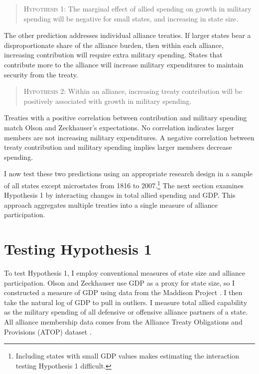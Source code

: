 \documentclass[12pt]{article}
\begin{document}
\begin{quote}
\textsc{Hypothesis 1}: The marginal effect of allied spending on growth in military spending will be negative for small states, and increasing in state size. 
\end{quote}


The other prediction addresses individual alliance treaties. 
If larger states bear a disproportionate share of the alliance burden, then within each alliance, increasing contribution will require extra military spending. 
States that contribute more to the alliance will increase military expenditures to maintain security from the treaty. 


\begin{quote}
\textsc{Hypothesis 2}: Within an alliance, increasing treaty contribution will be positively associated with growth in military spending. 
\end{quote}


Treaties with a positive correlation between contribution and military spending match Olson and Zeckhauser's expectations. 
No correlation indicates larger members are not increasing military expenditures.
A negative correlation between treaty contribution and military spending implies larger members decrease spending. 


I now test these two predictions using an appropriate research design in a sample of all states except microstates from 1816 to 2007.\footnote{Including states with small GDP values makes estimating the interaction testing Hypothesis 1 difficult.}
The next section examines Hypothesis 1 by interacting changes in total allied spending and GDP.
This approach aggregates multiple treaties into a single measure of alliance participation. 


\section{Testing Hypothesis 1}

To test Hypothesis 1, I employ conventional measures of state size and alliance participation. 
Olson and Zeckhauser use GDP as a proxy for state size, so I constructed a measure of GDP using data from the Maddison Project \citep{Boltetal2018}. 
I then take the natural log of GDP to pull in outliers. 
I measure total allied capability as the military spending of all defensive or offensive alliance partners of a state.
All alliance membership data comes from the Alliance Treaty Obligations and Provisions (ATOP) dataset \citep{Leedsetal2002}.  
\end{document}
